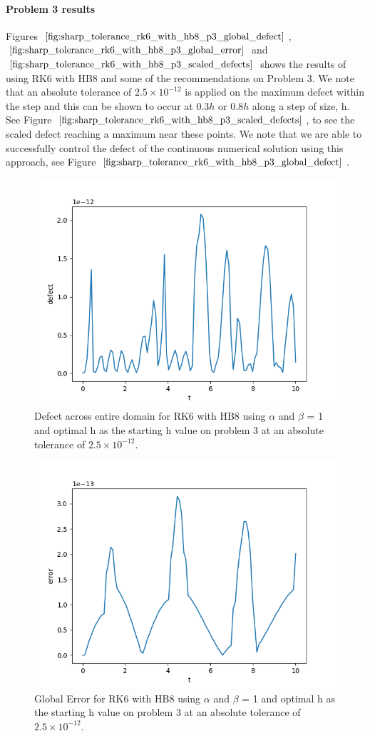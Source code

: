 \paragraph{Problem 3 results}
Figures $\ref{fig:sharp_tolerance_rk6_with_hb8_p3_global_defect}$, $\ref{fig:sharp_tolerance_rk6_with_hb8_p3_global_error}$ and $\ref{fig:sharp_tolerance_rk6_with_hb8_p3_scaled_defects}$ shows the results of using RK6 with HB8 and some of the recommendations on Problem 3. We note that an absolute tolerance of $2.5 \times 10^{-12}$ is applied on the maximum defect within the step and this can be shown to occur at $0.3h$ or $0.8h$ along a step of size, h. See Figure $\ref{fig:sharp_tolerance_rk6_with_hb8_p3_scaled_defects}$, to see the scaled defect reaching a maximum near these points. We note that we are able to successfully control the defect of the continuous numerical solution using this approach, see Figure $\ref{fig:sharp_tolerance_rk6_with_hb8_p3_global_defect}$. 
\begin{figure}[H]
\centering
\includegraphics[width=0.7\linewidth]{./figures/sharp_tolerance_rk4_with_hb6_p3_global_defect}
\caption{Defect across entire domain for RK6 with HB8 using $\alpha$ and $\beta$ = 1 and optimal h as the starting h value on problem 3 at an absolute tolerance of $2.5 \times 10^{-12}$.}
\label{fig:sharp_tolerance_rk6_with_hb8_p3_global_defect}
\end{figure}

\begin{figure}[H]
\centering
\includegraphics[width=0.7\linewidth]{./figures/sharp_tolerance_rk6_with_hb8_p3_global_error}
\caption{Global Error for RK6 with HB8 using $\alpha$ and $\beta$ = 1 and optimal h as the starting h value on problem 3 at an absolute tolerance of $2.5 \times 10^{-12}$.}
\label{fig:sharp_tolerance_rk6_with_hb8_p3_global_error}
\end{figure}

